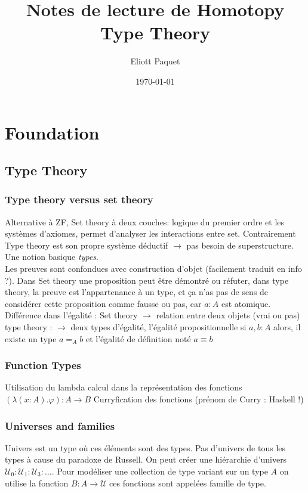 \documentclass[a4paper,12pt]{report}
\title{Notes de lecture de Homotopy Type Theory}
\author{Eliott Paquet}
\date{\today}
\newcommand{\paren}[1]{\left(#1\right)}
\renewcommand{\cal}[1]{\mathcal{#1}}
\newcommand{\ds}{\displaystyle}
\renewcommand{\to}{\longrightarrow}
\renewcommand{\phi}{\varphi}
\begin{document}
\renewcommand{\labelitemi}{\(\bullet\)}
\renewcommand{\labelenumi}{(\arabic{enumi})}

\everymath{\ds}

\maketitle
\chapter{Foundation}
\section{Type Theory}
\subsection{Type theory versus set theory}

Alternative à ZF, Set theory à deux couches: logique du premier ordre et les systèmes d'axiomes, permet d'analyser les interactions entre set. Contrairement Type theory est son propre système déductif \(\to\) pas besoin de superstructure. Une notion basique \textit{types}.\\
Les preuves sont confondues avec construction d'objet (facilement traduit en info ?). Dans Set theory une proposition peut être démontré ou réfuter, dans type theory, la preuve est l'appartenance à un type, et ça n'as pas de sens de considérer cette proposition comme fausse ou pas, car \(a : A\) est atomique. \\
Différence dans l'égalité : Set theory \( \to \) relation entre deux objets (vrai ou pas) type theory : \(\to \) deux types d'égalité, l'égalité propositionnelle si \(a,b : A\) alors, il existe un type \(a =_{A} b\) et l'égalité de définition noté \(a \equiv b\)
\subsection{Function Types}
Utilisation du lambda calcul dans la représentation des fonctions \(\paren{\lambda \paren{x:A}.\phi}: A \to B\)
Curryfication des fonctions (prénom de Curry  : Haskell !)
\subsection{Universes and families}

Univers est un type où ces éléments sont des types. Pas d'univers de tous les types à cause du paradoxe de Russell. On peut créer une hiérarchie d'univers \(\mathcal{U}_0:\cal{U}_1:\cal{U}_3:\dots\).
Pour modéliser une collection de type variant sur un type \(A\) on utilise la fonction \(B : A \to \cal{U}\) ces fonctions sont appelées famille de type.
\end{document}
